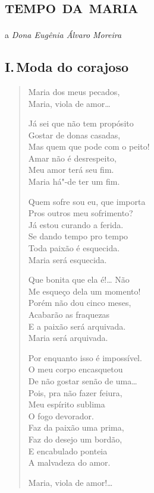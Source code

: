 \chapter[\textsc{tempo da maria}I.\,Moda do corajoso]{\textsc{tempo da maria} }

\begin{flushright}
a \emph{Dona Eugênia Álvaro Moreira}
\end{flushright}

\section*{I.\,Moda do corajoso}

\begin{verse}
Maria dos meus pecados,\\
Maria, viola de amor\ldots{}

Já sei que não tem propósito\\
Gostar de donas casadas,\\
Mas quem que pode com o peito!\\
Amar não é desrespeito,\\
Meu amor terá seu fim.\\
Maria há"-de ter um fim.

Quem sofre sou eu, que importa\\
Pros outros meu sofrimento?\\
Já estou curando a ferida.\\
Se dando tempo pro tempo\\
Toda paixão é esquecida.\\
Maria será esquecida.

Que bonita que ela é!\ldots{} Não\\
Me esqueço dela um momento!\\
Porém não dou cinco meses,\\
Acabarão as fraquezas\\
E a paixão será arquivada.\\
Maria será arquivada.

Por enquanto isso é impossível.\\
O meu corpo encasquetou\\
De não gostar senão de uma\ldots{}\\
Pois, pra não fazer feiura,\\
Meu espírito sublima\\
O fogo devorador.\\
Faz da paixão uma prima,\\
Faz do desejo um bordão,\\
E encabulado ponteia\\
A malvadeza do amor.

Maria, viola de amor!\ldots{}
\end{verse}

